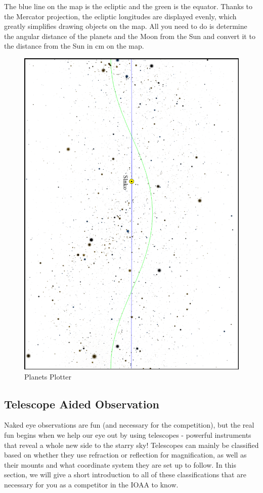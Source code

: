 \documentclass[a4paper,12pt]{extarticle}
\begin{document}
\begin{defi}
	The blue line on the map is the ecliptic and the green is the equator. Thanks to the Mercator projection, the ecliptic longitudes are displayed evenly, which greatly simplifies drawing objects on the map. All you need to do is determine the angular distance of the planets and the Moon from the Sun and convert it to the distance from the Sun in cm on the map.
\end{defi}
\begin{figure}[H]
	\centering
	\includegraphics[width=0.9\linewidth]{slovak_obs.png}
	\caption{Planets Plotter}
	\label{planets_plot}
\end{figure}

\clearpage
\subsection{Telescope Aided Observation}
Naked eye observations are fun (and necessary for the competition), but the real fun begins when we help our eye out by using telescopes - powerful instruments that reveal a whole new side to the starry sky! Telescopes can mainly be classified based on whether they use refraction or reflection for magnification, as well as their mounts and what coordinate system they are set up to follow. In this section, we will give a short introduction to all of these classifications that are necessary for you as a competitor in the IOAA to know.\\
\end{document}
